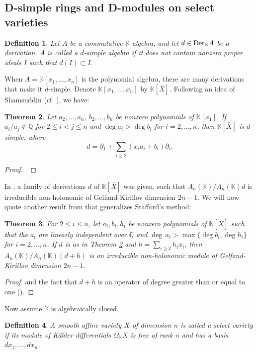 \documentclass[12pt, a4paper]{amsart}
\newtheorem{theorem}{Theorem}[section]
\newtheorem{definition}[theorem]{Definition}
\newcommand{\Weyl}{A_n(\mathbb{K})} %
\newcommand{\Der}{{\rm{Der}}}
\def\KK{\mathbb K}
\begin{document}
\subsection{D-simple rings and D-modules on select varieties}
\begin{definition}
    Let $A$ be a commutative $\KK$-algebra, and let $d \in \Der_\KK A$ be a derivation. $A$ is called a $d$-\textit{simple algebra} if it does not contain nonzero proper ideals $I$ such that $d(I) \subset I$.
\end{definition}
When $A=\KK[x_1,\ldots,x_n]$ is the polynomial algebra, there are many derivations that make it $d$-simple. Denote $\KK[x_1,\ldots,x_n]$ by $\KK[\bar{X}]$. Following an idea of Shamsuddin (cf. \cite[Theorem 2.3.16]{Archer}), we have:
\begin{theorem}\label{d-simple}
    Let $a_2, \ldots, a_n$, $b_2, \ldots, b_n$ be nonzero polynomials of $\KK[x_1]$. If $a_i/a_j \notin \mathbb{Q}$ for $2 \leq i < j \leq n$ and $\deg a_i > \deg b_i$ for $i=2, \ldots ,n$, then $\KK[\bar{X}]$ is $d$-simple, where
    \[ d= \partial_1 + \sum_{i \geq 2}(x_i a_i + b_i) \partial_i.\]
\end{theorem}
\begin{proof}
    \cite[Theorem 3.3]{Coutinho0}.
\end{proof}
In \cite{Stafford}, a family of derivations $d$ of $\KK[\bar{X}]$ was given, such that $\Weyl/\Weyl d$ is irreducible non-holonomic of Gelfand-Kirillov dimension $2n-1$. We will now quote another result from \cite{Coutinho0} that generalizes Stafford's method:
\begin{theorem}\label{Stafford-generalized}
    For $2 \leq i \leq n$, let $a_i, b_i, h_i$ be nonzero polynomials of $\KK[\bar{X}]$ such that the $a_i$ are linearly independent over $\mathbb{Q}$ and $\deg \, a_i > \max\{\deg b_i, \deg h_i \}$ for $i=2,\ldots, n$. If $d$ is as in Theorem \ref{d-simple} and $h=\sum_{i \geq 2} h_i x_i$, then $\Weyl/\Weyl(d+h)$ is an irreducible non-holonomic module of Gelfand-Kirillov dimension $2n-1$.
\end{theorem}
\begin{proof}
    \cite[Theorem 3.6]{Coutinho0} and the fact that $d+h$ is an operator of degree greater than or equal to one (\cite[pp. 407]{Coutinho0}).
\end{proof}
Now assume $\KK$ is algebraically closed.
\begin{definition}
    A smooth affine variety $X$ of dimension $n$ is called a \textit{select} variety if its module of K\"ahler differentials $\Omega_\KK X$ is free of rank $n$ and has a basis $dx_1, \ldots, dx_n$.
\end{definition}
\end{document}
